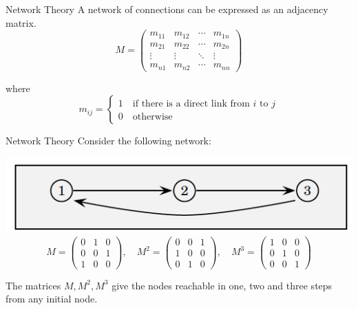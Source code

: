 \documentclass{./../../Latex/teaching_slides}
\begin{document}
\begin{frame}{Network Theory}
A network of connections can be expressed as an adjacency matrix.
$$ M=\left(\begin{array}{cccc}
m_{11} & m_{12} & \cdots & m_{1 n} \\
m_{21} & m_{22} & \cdots & m_{2 n} \\
\vdots & \vdots & \ddots & \vdots \\
m_{n 1} & m_{n 2} & \cdots & m_{n n}
\end{array}\right)  $$

where 
$$ m_{ij} = \begin{cases}
	1 \quad \text{if there is a direct link from $i$ to $j$} \\
	0 \quad \text{otherwise}
\end{cases} $$
\end{frame}

\begin{frame}{Network Theory}
\vspace{-0.25cm}
Consider the following network: \vspace{-0.25cm}
\begin{center}
\includegraphics[scale=0.5]{eg.png}
$$ M=\left(\begin{array}{lll}
0 & 1 & 0 \\
0 & 0 & 1 \\
1 & 0 & 0
\end{array}\right), \quad M^2=\left(\begin{array}{lll}
0 & 0 & 1 \\
1 & 0 & 0 \\
0 & 1 & 0
\end{array}\right), \quad M^3=\left(\begin{array}{lll}
1 & 0 & 0 \\
0 & 1 & 0 \\
0 & 0 & 1
\end{array}\right) $$	
\end{center}
The matrices $M, M^2, M^3$ give the nodes reachable in one, two and three
steps from any initial node.
\end{frame}
\end{document}
